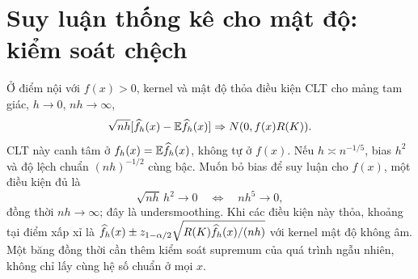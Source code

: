\section{Suy luận thống kê cho mật độ: kiểm soát chệch}
Ở điểm nội với $f(x)>0$, kernel và mật độ thỏa điều kiện CLT cho mảng
tam giác, $h\to0$, $nh\to\infty$,
\[
\sqrt{nh}[\widehat f_h(x)-\mathbb E\widehat f_h(x)]\Rightarrow N(0,f(x)R(K)).
\]
CLT này canh tâm ở $f_h(x)=\mathbb E\widehat f_h(x)$, không tự ở $f(x)$.
Nếu $h\asymp n^{-1/5}$, bias $h^2$ và độ lệch chuẩn $(nh)^{-1/2}$
cùng bậc. Muốn bỏ bias để suy luận cho $f(x)$, một điều kiện đủ là
\[
\sqrt{nh}\,h^2\to0\quad\Longleftrightarrow\quad nh^5\to0,
\]
đồng thời $nh\to\infty$; đây là undersmoothing.
Khi các điều kiện này thỏa, khoảng tại điểm xấp xỉ là
$\widehat f_h(x)\pm z_{1-\alpha/2}\sqrt{R(K)\widehat f_h(x)/(nh)}$ với kernel
mật độ không âm. Một băng đồng thời cần thêm kiểm soát supremum của
quá trình ngẫu nhiên, không chỉ lấy cùng hệ số chuẩn ở mọi $x$.
